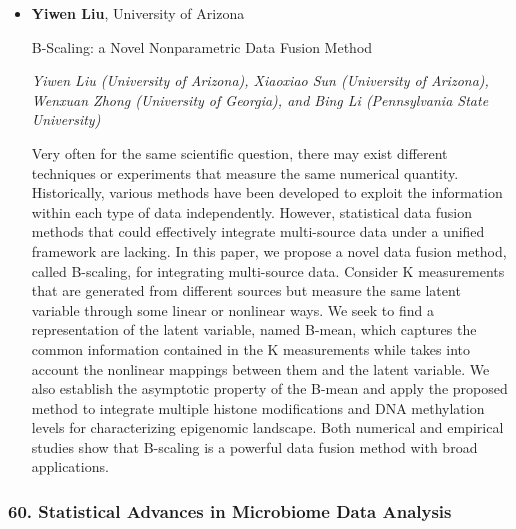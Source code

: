 \begin{itemize}
\item \textbf{Yiwen Liu}, University of Arizona

B-Scaling: a Novel Nonparametric Data Fusion Method

\emph{\footnotesize Yiwen Liu (University of Arizona), Xiaoxiao Sun (University of Arizona), Wenxuan Zhong (University of Georgia), and Bing Li (Pennsylvania State University)}

Very often for the same scientific question, there may exist different techniques or experiments that measure the same numerical quantity. Historically, various methods have been developed to exploit the information within each type of data independently. However, statistical data fusion methods that could effectively integrate multi-source data under a unified framework are lacking. In this paper, we propose a novel data fusion method, called B-scaling, for integrating multi-source data. Consider K measurements that are generated from different sources but measure the same latent variable through some linear or nonlinear ways. We seek to find a representation of the latent variable, named B-mean, which captures the common information contained in the K measurements while takes into account the nonlinear mappings between them and the latent variable. We also establish the asymptotic property of the B-mean and apply the proposed method to integrate multiple histone modifications and DNA methylation levels for characterizing epigenomic landscape. Both numerical and empirical studies show that B-scaling is a powerful data fusion method with broad applications.

\end{itemize}

\subsubsection*{60. Statistical Advances in Microbiome Data Analysis}

